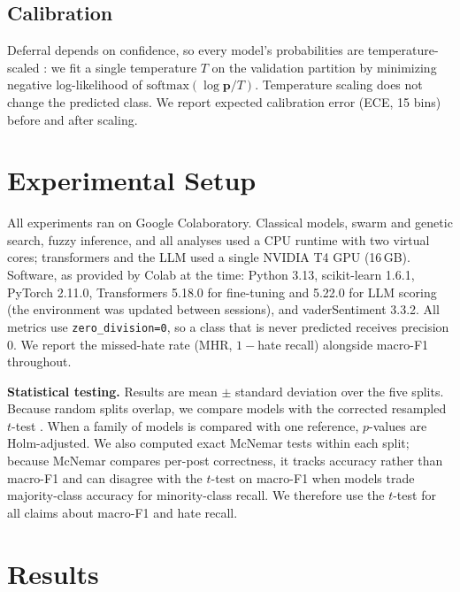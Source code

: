 \documentclass[lettersize,journal]{IEEEtran}
\begin{document}
\subsection{Calibration}
Deferral depends on confidence, so every model's probabilities are temperature-scaled \cite{guo2017calibration}: we fit a single temperature $T$ on the validation partition by minimizing negative log-likelihood of $\mathrm{softmax}(\log\mathbf{p}/T)$. Temperature scaling does not change the predicted class. We report expected calibration error (ECE, 15 bins) before and after scaling.

\section{Experimental Setup}
All experiments ran on Google Colaboratory. Classical models, swarm and genetic search, fuzzy inference, and all analyses used a CPU runtime with two virtual cores; transformers and the LLM used a single NVIDIA T4 GPU (16\,GB). Software, as provided by Colab at the time: Python 3.13, scikit-learn 1.6.1, PyTorch 2.11.0, Transformers 5.18.0 for fine-tuning and 5.22.0 for LLM scoring (the environment was updated between sessions), and vaderSentiment 3.3.2. All metrics use \texttt{zero\_division=0}, so a class that is never predicted receives precision 0. We report the missed-hate rate (MHR, $1-$hate recall) alongside macro-F1 throughout.

\textbf{Statistical testing.} Results are mean $\pm$ standard deviation over the five splits. Because random splits overlap, we compare models with the corrected resampled $t$-test \cite{nadeau2003inference}. When a family of models is compared with one reference, $p$-values are Holm-adjusted. We also computed exact McNemar tests \cite{dietterich1998approximate} within each split; because McNemar compares per-post correctness, it tracks accuracy rather than macro-F1 and can disagree with the $t$-test on macro-F1 when models trade majority-class accuracy for minority-class recall. We therefore use the $t$-test for all claims about macro-F1 and hate recall.

\section{Results}
\end{document}
